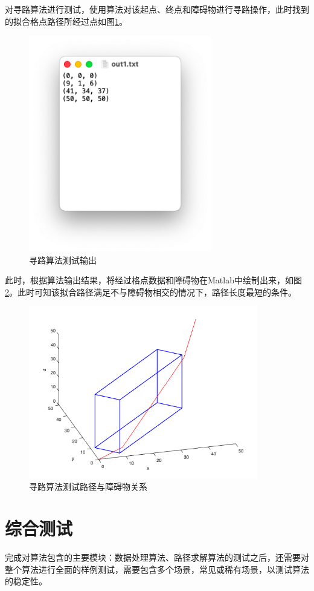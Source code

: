 \par 对寻路算法进行测试，使用算法对该起点、终点和障碍物进行寻路操作，此时找到的拟合格点路径所经过点如图\ref{fig:find_path_ex_out}。
\begin{figure}[htb]
    \centering
    \caption{寻路算法测试输出}
    \label{fig:find_path_ex_out}
    \includegraphics[width=8cm]{figures/find_path_ex_out.png}
\end{figure}
此时，根据算法输出结果，将经过格点数据和障碍物在Matlab中绘制出来，如图\ref{fig:find_path_ex_paint}。此时可知该拟合路径满足不与障碍物相交的情况下，路径长度最短的条件。
\begin{figure}[htb]
    \centering
    \caption{寻路算法测试路径与障碍物关系}
    \label{fig:find_path_ex_paint}
    \includegraphics[width=10cm]{figures/find_path_ex_paint.png}
\end{figure}

\section{综合测试}
\par 完成对算法包含的主要模块：数据处理算法、路径求解算法的测试之后，还需要对整个算法进行全面的样例测试，需要包含多个场景，常见或稀有场景，以测试算法的稳定性。

